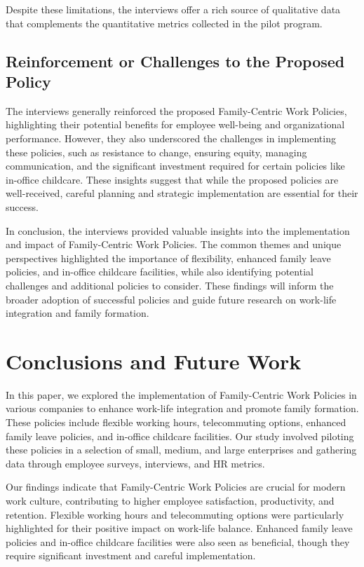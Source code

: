 \documentclass{article} %
\begin{document}
Despite these limitations, the interviews offer a rich source of qualitative data that complements the quantitative metrics collected in the pilot program.

\subsection{Reinforcement or Challenges to the Proposed Policy}

The interviews generally reinforced the proposed Family-Centric Work Policies, highlighting their potential benefits for employee well-being and organizational performance. However, they also underscored the challenges in implementing these policies, such as resistance to change, ensuring equity, managing communication, and the significant investment required for certain policies like in-office childcare. These insights suggest that while the proposed policies are well-received, careful planning and strategic implementation are essential for their success.

In conclusion, the interviews provided valuable insights into the implementation and impact of Family-Centric Work Policies. The common themes and unique perspectives highlighted the importance of flexibility, enhanced family leave policies, and in-office childcare facilities, while also identifying potential challenges and additional policies to consider. These findings will inform the broader adoption of successful policies and guide future research on work-life integration and family formation.

\section{Conclusions and Future Work}
\label{sec:conclusion}

In this paper, we explored the implementation of Family-Centric Work Policies in various companies to enhance work-life integration and promote family formation. These policies include flexible working hours, telecommuting options, enhanced family leave policies, and in-office childcare facilities. Our study involved piloting these policies in a selection of small, medium, and large enterprises and gathering data through employee surveys, interviews, and HR metrics.

Our findings indicate that Family-Centric Work Policies are crucial for modern work culture, contributing to higher employee satisfaction, productivity, and retention. Flexible working hours and telecommuting options were particularly highlighted for their positive impact on work-life balance. Enhanced family leave policies and in-office childcare facilities were also seen as beneficial, though they require significant investment and careful implementation.
\end{document}
